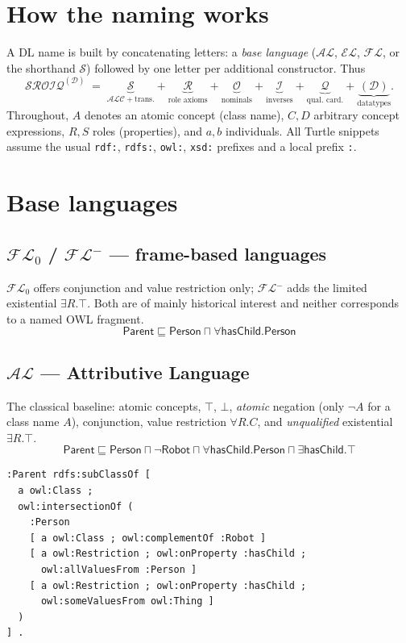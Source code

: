 \documentclass[11pt,a4paper]{article}
\newcommand{\dl}[1]{\ensuremath{\mathcal{#1}}}
\newcommand{\ALC}{\dl{ALC}}
\newcommand{\EL}{\dl{EL}}
\newcommand{\AL}{\dl{AL}}
\newcommand{\SROIQ}{\dl{SROIQ}}
\newcommand{\cn}[1]{\mathsf{#1}}      %
\newcommand{\rn}[1]{\mathsf{#1}}      %
\newcommand{\sub}{\sqsubseteq}
\newcommand{\dlaxiom}[1]{%
  \begin{displaymath}#1\end{displaymath}}
\begin{document}
\newpage
\tableofcontents
\bigskip

\section{How the naming works}

A DL name is built by concatenating letters: a \emph{base language}
(\AL{}, \EL{}, \dl{FL}, or the shorthand \dl{S}) followed by one letter per
additional constructor. Thus
\[
  \SROIQ^{(\mathcal{D})} \;=\;
  \underbrace{\dl{S}}_{\ALC + \text{trans.}} +
  \underbrace{\dl{R}}_{\text{role axioms}} +
  \underbrace{\dl{O}}_{\text{nominals}} +
  \underbrace{\dl{I}}_{\text{inverses}} +
  \underbrace{\dl{Q}}_{\text{qual.\ card.}} +
  \underbrace{(\mathcal{D})}_{\text{datatypes}} .
\]
Throughout, $A$ denotes an atomic concept (class name), $C, D$ arbitrary concept
expressions, $R, S$ roles (properties), and $a, b$ individuals.
All Turtle snippets assume the usual \texttt{rdf:}, \texttt{rdfs:},
\texttt{owl:}, \texttt{xsd:} prefixes and a local prefix \texttt{:}.

\section{Base languages}

\subsection*{\dl{FL}$_0$ / \dl{FL}$^-$ --- frame-based languages}
\dl{FL}$_0$ offers conjunction and value restriction only; \dl{FL}$^-$ adds the
limited existential $\exists R.\top$. Both are of mainly historical interest and
neither corresponds to a named OWL fragment.
\dlaxiom{\cn{Parent} \sub \cn{Person} \sqcap \forall \rn{hasChild}.\cn{Person}}

\subsection*{\AL{} --- Attributive Language}
The classical baseline: atomic concepts, $\top$, $\bot$, \emph{atomic} negation
(only $\neg A$ for a class name $A$), conjunction, value restriction
$\forall R.C$, and \emph{unqualified} existential $\exists R.\top$.
\dlaxiom{\cn{Parent} \sub \cn{Person} \sqcap \neg\cn{Robot} \sqcap
  \forall \rn{hasChild}.\cn{Person} \sqcap \exists \rn{hasChild}.\top}
\begin{lstlisting}
:Parent rdfs:subClassOf [
  a owl:Class ;
  owl:intersectionOf (
    :Person
    [ a owl:Class ; owl:complementOf :Robot ]
    [ a owl:Restriction ; owl:onProperty :hasChild ;
      owl:allValuesFrom :Person ]
    [ a owl:Restriction ; owl:onProperty :hasChild ;
      owl:someValuesFrom owl:Thing ]
  )
] .
\end{lstlisting}
\end{document}
